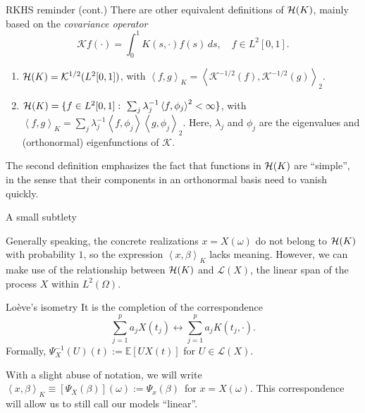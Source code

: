 \documentclass[10pt, english, professionalfonts]{beamer}
\newcommand\maroon[1]{\color{mLightBrown}#1\color{mDarkTeal}}
\newcommand{\E}{\mathbb{E}}
\newcommand{\Hcal}{\ensuremath\mathcal{H}}
\newcommand\dotprod[2]{\left\langle #1, #2 \right\rangle}
\begin{document}
\begin{frame}{RKHS reminder (cont.)}
  There are other equivalent definitions of \(\Hcal(K)\), mainly based on the \textit{covariance operator}
\[
\mathcal Kf(\cdot) = \int_0^1 K(s, \cdot)f(s)\, ds, \quad f\in L^2[0, 1].
\]

\begin{definition}
\begin{enumerate}
  \item  \(\Hcal(K) = \mathcal K^{1/2}(L^2[0, 1])\), with \(\dotprod{f}{g}_K = \dotprod{\mathcal K^{-1/2}(f)}{\mathcal K^{-1/2}(g)}_2\).
  \item \(\Hcal(K) = \{f \in L^2[0, 1]: \ \sum_j \lambda_j^{-1}\dotprod{f}{\phi_j}^2 < \infty \}\), with \(\dotprod{f}{g}_K = \sum_j \lambda_j^{-1}\dotprod{f}{\phi_j}\dotprod{g}{\phi_j}_2\). Here, \(\lambda_j\) and \(\phi_j\) are the eigenvalues and (orthonormal) eigenfunctions of \(\mathcal K\).
\end{enumerate}
\end{definition}

The second definition emphasizes the fact that functions in \(\Hcal(K)\) are ``simple'', in the sense that their components in an orthonormal basis need to vanish quickly.

\end{frame}

\begin{frame}{A small subtlety}

  Generally speaking, the concrete realizations \(x=X(\omega)\) \maroon{do not belong to \(\Hcal(K)\) with probability \(1\)}, so the expression \(\dotprod{x}{\beta}_K\) lacks meaning. However, we can make use of the relationship between \(\Hcal(K)\) and \(\mathcal L(X)\), the linear span of the process \(X\) within \(L^2(\Omega)\).


  \vspace{1em}
  \begin{block}{Loève's isometry}
    It is the completion of the correspondence
    \[
\sum_{j=1}^p a_j X(t_j) \longleftrightarrow \sum_{j=1}^p a_j K(t_j, \cdot).
    \]
    Formally, \(\Psi^{-1}_X(U)(t) := \E[U X(t)]\) for \(U \in \mathcal L(X)\).
  \end{block}
  With a slight abuse of notation, we will write \maroon{\(\dotprod{x}{\beta}_K \equiv [\Psi_X(\beta)](\omega) := \Psi_x(\beta)\)}\ for \(x=X(\omega)\). This correspondence will allow us to still call our models ``linear''.
\end{frame}
\end{document}
